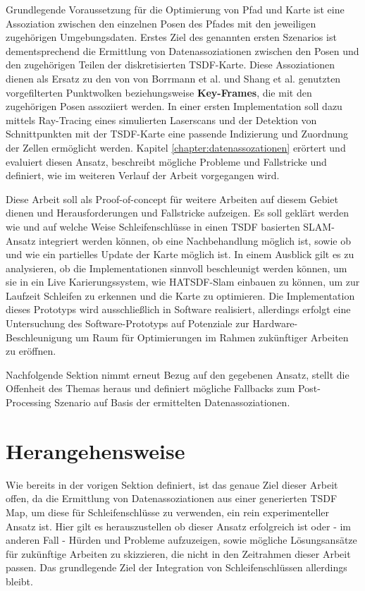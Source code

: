 Grundlegende Voraussetzung für die Optimierung von Pfad und Karte ist eine Assoziation zwischen den einzelnen Posen des Pfades mit den jeweiligen zugehörigen Umgebungsdaten.
Erstes Ziel des genannten ersten Szenarios ist dementsprechend die Ermittlung von Datenassoziationen zwischen den Posen und den zugehörigen Teilen der diskretisierten TSDF-Karte.
Diese Assoziationen dienen als Ersatz zu den von von Borrmann et al. \cite{borrmann2008globally} und Shang et al. \cite{shan2020lio} genutzten vorgefilterten Punktwolken beziehungsweise \textbf{Key-Frames}, die mit den zugehörigen Posen assoziiert werden.
In einer ersten Implementation soll dazu mittels Ray-Tracing eines simulierten Laserscans und der Detektion von Schnittpunkten mit der TSDF-Karte eine passende Indizierung und Zuordnung der Zellen ermöglicht werden.
Kapitel \ref{chapter:datenassozationen} erörtert und evaluiert diesen Ansatz, beschreibt mögliche Probleme und Fallstricke und definiert, wie im weiteren Verlauf der Arbeit vorgegangen wird.

Diese Arbeit soll als Proof-of-concept für weitere Arbeiten auf diesem Gebiet dienen und Herausforderungen und Fallstricke aufzeigen. Es soll geklärt werden wie und auf welche Weise Schleifenschlüsse in einen TSDF basierten SLAM-Ansatz integriert werden können, ob eine Nachbehandlung möglich ist, sowie ob und wie ein partielles Update der Karte möglich ist.
In einem Ausblick gilt es zu analysieren, ob die Implementationen sinnvoll beschleunigt werden können, um sie in ein Live Karierungssystem, wie HATSDF-Slam einbauen zu können, um zur Laufzeit Schleifen zu erkennen und die Karte zu optimieren.
Die Implementation dieses Prototyps wird ausschließlich in Software realisiert, allerdings erfolgt eine Untersuchung des Software-Prototyps auf Potenziale zur Hardware-Beschleunigung um Raum für Optimierungen im Rahmen zukünftiger Arbeiten zu eröffnen.

Nachfolgende Sektion nimmt erneut Bezug auf den gegebenen Ansatz, stellt die Offenheit des Themas heraus und definiert mögliche Fallbacks zum Post-Processing Szenario auf Basis der ermittelten Datenassoziationen.

\section{Herangehensweise}
\label{section:herangehensweise}

Wie bereits in der vorigen Sektion definiert, ist das genaue Ziel dieser Arbeit offen, da die Ermittlung von Datenassoziationen aus einer generierten TSDF Map, um diese für Schleifenschlüsse zu verwenden, ein rein experimenteller Ansatz ist.
Hier gilt es herauszustellen ob dieser Ansatz erfolgreich ist oder - im anderen Fall - Hürden und Probleme aufzuzeigen, sowie mögliche Lösungsansätze für zukünftige Arbeiten zu skizzieren, die nicht in den Zeitrahmen dieser Arbeit passen.
Das grundlegende Ziel der Integration von Schleifenschlüssen allerdings bleibt.

